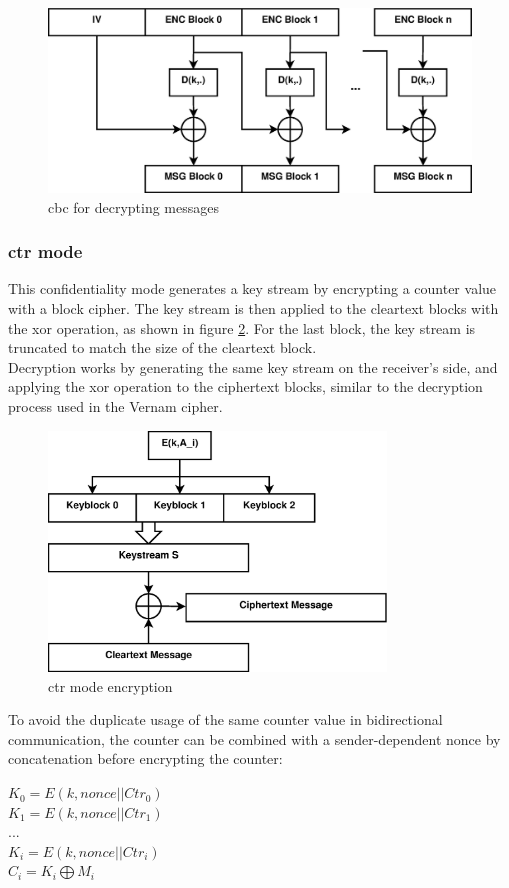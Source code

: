 \begin{figure}
    \centering
    \includegraphics[width=1\textwidth]{figures/CBCdecrypt.eps}
    \caption{\gls{cbc} for decrypting messages}
    \label{fig:cbc_decrypt}
\end{figure}

\subsubsection{\gls{ctr} mode}

This confidentiality mode generates a key stream by encrypting a counter value with a block cipher. The key stream is then applied to the cleartext
blocks with the \gls{xor} operation, as shown in figure \ref{fig:ctr}. For the last block, the key stream is truncated to match the size of the cleartext block.
\\
Decryption works by generating the same key stream on the receiver's side, and applying the \gls{xor} operation to the ciphertext blocks, similar to the
decryption process used in the Vernam cipher.
\begin{figure}
    \centering
    \includegraphics[width=0.8\textwidth]{figures/CTR.eps}
    \caption{\gls{ctr} mode encryption}
    \label{fig:ctr}
\end{figure}
To avoid the duplicate usage of the same counter value in bidirectional communication, the counter can be combined with a sender-dependent nonce by
concatenation before encrypting the counter:
\begin{center}
 $K_{0} = E(k, nonce || Ctr_0)$\\
 $K_{1} = E(k, nonce || Ctr_1)$\\
 ...\\
 $K_{i} = E(k, nonce || Ctr_i)$\\
 $C_i = K_i \bigoplus M_i$
\end{center}
 
